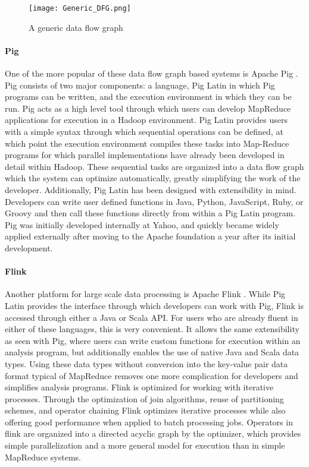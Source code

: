 \begin{figure}
	\centering
	\texttt{[image: Generic\_DFG.png]}
	\caption{A generic data flow graph \cite{Ho2008}}
	\label{fig:dfg}
\end{figure}

\paragraph{Pig}
One of the more popular of these data flow graph based systems is Apache Pig \cite{Gates2009}. Pig consists of two major components: a language, Pig Latin \cite{Olston2008a} in which Pig programs can be written, and the execution environment in which they can be run. Pig acts as a high level tool through which users can develop MapReduce applications for execution in a Hadoop environment. Pig Latin provides users with a simple syntax through which sequential operations can be defined, at which point the execution environment compiles these tasks into Map-Reduce programs for which parallel implementations have already been developed in detail within Hadoop. These sequential tasks are organized into a data flow graph which the system can optimize automatically, greatly simplifying the work of the developer. Additionally, Pig Latin has been designed with extensibility in mind. Developers can write user defined functions in Java, Python, JavaScript, Ruby, or Groovy and then call these functions directly from within a Pig Latin program. Pig was initially developed internally at Yahoo, and quickly became widely applied externally after moving to the Apache foundation a year after its initial development. 

\paragraph{Flink}
Another platform for large scale data processing is Apache Flink \cite{Flink2015}. While Pig Latin provides the interface through which developers can work with Pig, Flink is accessed through either a Java or Scala API. For users who are already fluent in either of these languages, this is very convenient. It allows the same extensibility as seen with Pig, where users can write custom functions for execution within an analysis program, but additionally enables the use of native Java and Scala data types. Using these data types without conversion into the key-value pair data format typical of MapReduce removes one more complication for developers and simplifies analysis programs. Flink is optimized for working with iterative processes. Through the optimization of join algorithms, reuse of partitioning schemes, and operator chaining Flink optimizes iterative processes while also offering good performance when applied to batch processing jobs. Operators in flink are organized into a directed acyclic graph by the optimizer, which provides simple parallelization and a more general model for execution than in simple MapReduce systems. 

